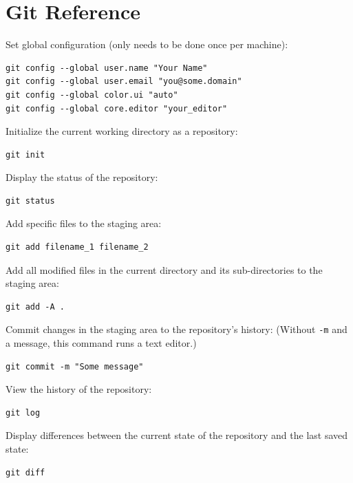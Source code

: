 \documentclass[]{book}
\begin{document}
\section{Git Reference}

Set global configuration (only needs to be done once per machine):

\begin{verbatim}
git config --global user.name "Your Name"
git config --global user.email "you@some.domain"
git config --global color.ui "auto"
git config --global core.editor "your_editor"
\end{verbatim}

Initialize the current working directory as a repository:

\begin{verbatim}
git init
\end{verbatim}

Display the status of the repository:

\begin{verbatim}
git status
\end{verbatim}

Add specific files to the staging area:

\begin{verbatim}
git add filename_1 filename_2
\end{verbatim}

Add all modified files in the current directory and its sub-directories
to the staging area:

\begin{verbatim}
git add -A .
\end{verbatim}

Commit changes in the staging area to the repository's history: (Without
\texttt{-m} and a message, this command runs a text editor.)

\begin{verbatim}
git commit -m "Some message"
\end{verbatim}

View the history of the repository:

\begin{verbatim}
git log
\end{verbatim}

Display differences between the current state of the repository and the
last saved state:

\begin{verbatim}
git diff
\end{verbatim}
\end{document}
